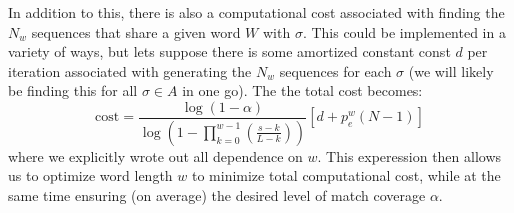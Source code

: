 \documentclass[12pt]{article}
\begin{document}
In addition to this, there is also a computational cost associated with finding the $N_w$ sequences that share a given word $W$ with $\sigma$. This could be implemented in a variety of ways, but lets suppose there is some amortized constant const $d$ per iteration associated with generating the $N_w$ sequences for each $\sigma$ (we will likely be finding this for all $\sigma \in A$ in one go). The the total cost becomes:
\begin{equation}
\mathrm{cost} = \frac{\log{(1 - \alpha)}}{\log{(1 - \prod_{k=0}^{w-1} \left(\frac{s - k}{L - k}\right))}} \left[ d + p_e^w (N-1) \right]
\end{equation}
where we explicitly wrote out all dependence on $w$. This experession then allows us to optimize word length $w$ to minimize total computational cost, while at the same time ensuring (on average) the desired level of match coverage $\alpha$.
\end{document}
